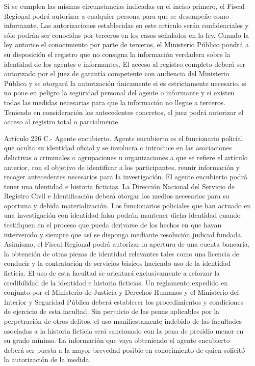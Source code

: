     Si se cumplen las mismas circunstancias indicadas en el inciso primero, el Fiscal Regional podrá autorizar a cualquier persona para que se desempeñe como informante.
    Las autorizaciones establecidas en este artículo serán confidenciales y sólo podrán ser conocidas por terceros en los casos señalados en la ley.
    Cuando la ley autorice el conocimiento por parte de terceros, el Ministerio Público pondrá a su disposición el registro que no consigna la información verdadera sobre la identidad de los agentes e informantes. El acceso al registro completo deberá ser autorizado por el juez de garantía competente con audiencia del Ministerio Público y se otorgará la autorización únicamente si es estrictamente necesario, si no pone en peligro la seguridad personal del agente o informante y si existen todas las medidas necesarias para que la información no llegue a terceros. Teniendo en consideración los antecedentes concretos, el juez podrá autorizar el acceso al registro total o parcialmente.

    Artículo 226 C.- Agente encubierto. Agente encubierto es el funcionario policial que oculta su identidad oficial y se involucra o introduce en las asociaciones delictivas o criminales o agrupaciones u organizaciones a que se refiere el artículo anterior, con el objetivo de identificar a los participantes, reunir información y recoger antecedentes necesarios para la investigación.
    El agente encubierto podrá tener una identidad e historia ficticias. La Dirección Nacional del Servicio de Registro Civil e Identificación deberá otorgar los medios necesarios para su oportuna y debida materialización. Los funcionarios policiales que han actuado en una investigación con identidad falsa podrán mantener dicha identidad cuando testifiquen en el proceso que pueda derivarse de los hechos en que hayan intervenido y siempre que así se disponga mediante resolución judicial fundada.
    Asimismo, el Fiscal Regional podrá autorizar la apertura de una cuenta bancaria, la obtención de otras piezas de identidad relevantes tales como una licencia de conducir y la contratación de servicios básicos haciendo uso de la identidad ficticia. El uso de esta facultad se orientará exclusivamente a reforzar la credibilidad de la identidad e historia ficticias. Un reglamento expedido en conjunto por el Ministerio de Justicia y Derechos Humanos y el Ministerio del Interior y Seguridad Pública deberá establecer los procedimientos y condiciones de ejercicio de esta facultad.
    Sin perjuicio de las penas aplicables por la perpetración de otros delitos, el uso manifiestamente indebido de las facultades asociadas a la historia ficticia será sancionado con la pena de presidio menor en su grado mínimo.
    La información que vaya obteniendo el agente encubierto deberá ser puesta a la mayor brevedad posible en conocimiento de quien solicitó la autorización de la medida.

